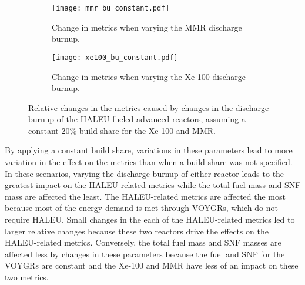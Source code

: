 \begin{figure}[h!]
    \centering
    \begin{subfigure}{0.48\textwidth}
        \centering
        \texttt{[image: mmr\_bu\_constant.pdf]}
        \caption{Change in metrics when varying the MMR discharge burnup.}
        \label{fig:mmr_bu_constant}
    \end{subfigure}
    \hfill
    \begin{subfigure}{0.48\textwidth}
        \centering
        \texttt{[image: xe100\_bu\_constant.pdf]}
        \caption{Change in metrics when varying the Xe-100 discharge burnup.}
        \label{fig:xe100_bu_constant}
    \end{subfigure}
    \caption{Relative changes in the metrics caused by changes in the discharge 
    burnup of the HALEU-fueled advanced reactors, assuming a constant 
    20\% build share for the Xe-100 and MMR.}
    \label{fig:bu_constant}
\end{figure}

By applying a constant build share, variations in these parameters lead to 
more variation in the effect on the metrics than when a build share was not 
specified. In these scenarios, varying the discharge burnup of either reactor 
leads to the greatest impact on the \gls{HALEU}-related metrics while the  
total fuel mass and \gls{SNF} mass are affected the least. 
The \gls{HALEU}-related metrics are affected the most because most of the 
energy demand is met through VOYGRs, which do not require \gls{HALEU}. 
Small changes in the each of the \gls{HALEU}-related metrics led to larger 
relative changes because these two reactors drive the effects on the 
\gls{HALEU}-related metrics. Conversely, the total fuel mass and \gls{SNF} 
masses are affected less by changes in these parameters because the fuel 
and \gls{SNF} for the VOYGRs are constant and the Xe-100 and \gls{MMR} 
have less of an impact on these two metrics. 